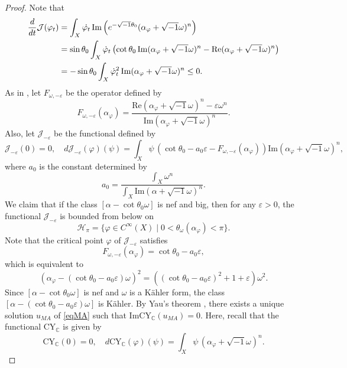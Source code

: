 \documentclass{amsart}
\numberwithin{equation}{section}
\theoremstyle{plain}
\theoremstyle{definition}
\theoremstyle{remark}
\begin{document}
\begin{proof}
    Note that
    \begin{align}\label{eqdhymderiv}
        \frac{d}{dt}\mathcal{J}(\varphi_t)
        &=\int_X \dot{\varphi_t} \, \mathrm{Im}\left(e^{-\sqrt{-1}\theta_0}(\alpha_\varphi+\sqrt{-1}\omega)^n\right) \notag\\
        &=\sin{\theta_0}\int_X \dot{\varphi}_t \left(\cot{\theta_0}\, \mathrm{Im}(\alpha_\varphi+\sqrt{-1}\omega)^n-\mathrm{Re}(\alpha_\varphi+\sqrt{-1}\omega)^n
        \right) \notag\\
        &=-\sin{\theta_0}\int_X \dot{\varphi}_t^2 \, \mathrm{Im}(\alpha_\varphi+\sqrt{-1}\omega)^n \le0.
    \end{align}
    As in \cite{CL}, let $F_{\omega,-\varepsilon}$ be the operator defined by
    $$F_{\omega,-\varepsilon}(\alpha_\varphi)= \frac{\mathrm{Re}(\alpha_\varphi+\sqrt{-1}\omega)^n-\varepsilon\omega^n}{\mathrm{Im}(\alpha_\varphi+\sqrt{-1}\omega)^n}.$$
    Also, let $\mathcal{J}_{-\varepsilon}$ be the functional defined by
    $$\mathcal{J}_{-\varepsilon}(0)=0, \quad d\mathcal{J}_{-\varepsilon}(\varphi)(\psi)=\int_X \psi \, \left(\cot{\theta_0}-a_0\varepsilon-F_{\omega,-\varepsilon}(\alpha_\varphi)\right)\mathrm{Im}(\alpha_\varphi+\sqrt{-1}\omega)^n,$$
    where $a_0$ is the constant determined by
    $$a_0=\frac{\int_X\omega^n}{\int_X \mathrm{Im}(\alpha+\sqrt{-1}\omega)^n}.$$
    We claim that if the class $[\alpha-\cot{\theta_0}\omega]$ is nef and big, then for any $\varepsilon>0$, the functional $\mathcal{J}_{-\varepsilon}$ is bounded from below on 
    $$\mathcal{H}_\pi=\{ \varphi \in C^\infty(X) \mid  0 < \theta_\omega(\alpha_\varphi) < \pi\}.$$
    Note that the critical point $\varphi$ of $\mathcal{J}_{-\varepsilon}$ satisfies
    $$F_{\omega,-\varepsilon}(\alpha_\varphi)=\cot{\theta_0}-a_0\varepsilon,$$
    which is equivalent to
    \begin{equation}\label{eqMA}
        \left(\alpha_\varphi-(\cot{\theta_0}-a_0\varepsilon)\omega\right)^2=(\left(\cot{\theta_0}-a_0\varepsilon\right)^2+1+\varepsilon)\omega^2.
    \end{equation}
    Since $[\alpha-\cot{\theta_0}\omega]$ is nef and $\omega$ is a K{\"a}hler form, the class $[\alpha-(\cot{\theta_0}-a_0\varepsilon)\omega]$ is K{\"a}hler. By Yau's theorem \cite{Yau}, there exists a unique solution $u_{MA}$ of \eqref{eqMA} such that $\mathrm{Im}\mathrm{CY}_\mathbb{C}(u_{MA})=0$. Here, recall that the functional $\mathrm{CY}_\mathbb{C}$ is given by
    $$\mathrm{CY}_\mathbb{C}(0)=0,\quad d\mathrm{CY}_\mathbb{C}(\varphi)(\psi)=\int_X \psi \, (\alpha_\varphi+\sqrt{-1}\omega)^n.$$

\end{proof}
\end{document}
